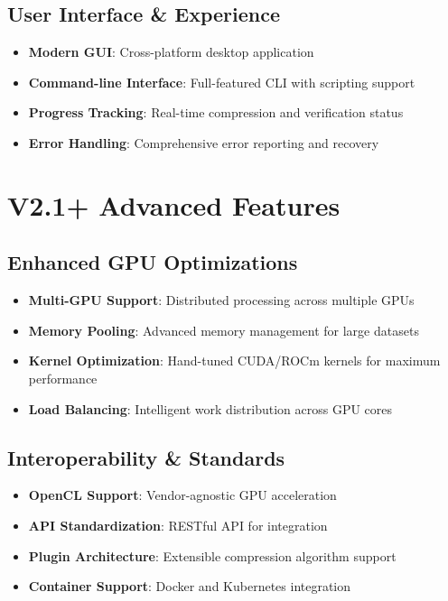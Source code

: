 \documentclass[12pt,a4paper]{article}
\begin{document}
\subsection{User Interface \& Experience}
\begin{itemize}
    \item \textbf{Modern GUI}: Cross-platform desktop application
    \item \textbf{Command-line Interface}: Full-featured CLI with scripting support
    \item \textbf{Progress Tracking}: Real-time compression and verification status
    \item \textbf{Error Handling}: Comprehensive error reporting and recovery
\end{itemize}

\section{V2.1+ Advanced Features}

\subsection{Enhanced GPU Optimizations}
\begin{itemize}
    \item \textbf{Multi-GPU Support}: Distributed processing across multiple GPUs
    \item \textbf{Memory Pooling}: Advanced memory management for large datasets
    \item \textbf{Kernel Optimization}: Hand-tuned CUDA/ROCm kernels for maximum performance
    \item \textbf{Load Balancing}: Intelligent work distribution across GPU cores
\end{itemize}

\subsection{Interoperability \& Standards}
\begin{itemize}
    \item \textbf{OpenCL Support}: Vendor-agnostic GPU acceleration
    \item \textbf{API Standardization}: RESTful API for integration
    \item \textbf{Plugin Architecture}: Extensible compression algorithm support
    \item \textbf{Container Support}: Docker and Kubernetes integration
\end{itemize}
\end{document}

